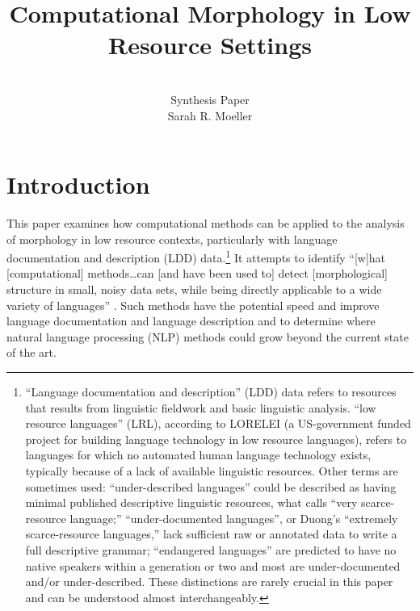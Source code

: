 \documentclass[12pt]{article}
\title{Computational Morphology in Low Resource Settings}
\author{\\Synthesis Paper \\ Sarah R. Moeller}
\date{}
\begin{document}
\maketitle

\section{Introduction}

 This paper examines how computational methods can be applied to the analysis of morphology in low resource contexts, particularly with language documentation and description (LDD) data.\footnote{``Language documentation and description'' (LDD) data refers to resources that results from linguistic fieldwork and basic linguistic analysis. ``low resource languages'' (LRL), according to LORELEI (a US-government funded project for building language technology in low resource languages), refers to languages for which no automated human language technology exists, typically because of a lack of available linguistic resources. Other terms are sometimes used: ``under-described languages'' could be described as having minimal published descriptive linguistic resources, what  calls ``very scarce-resource language;'' ``under-documented languages'', or Duong's ``extremely scarce-resource languages,'' lack sufficient raw or annotated data to write a full descriptive grammar; ``endangered languages'' are predicted to have no native speakers within a generation or two and most are under-documented and/or under-described. These distinctions are rarely crucial in this paper and can be understood almost interchangeably.} It attempts to identify ``[w]hat [computational] methods…can [and have been used to] detect [morphological] structure in small, noisy data sets, while being directly applicable to a wide variety of languages'' \cite[page 472]{bird_natural_2009}. Such methods have the potential speed and improve language documentation and language description and to determine where natural language processing (NLP) methods could grow beyond the current state of the art. 
\end{document}
